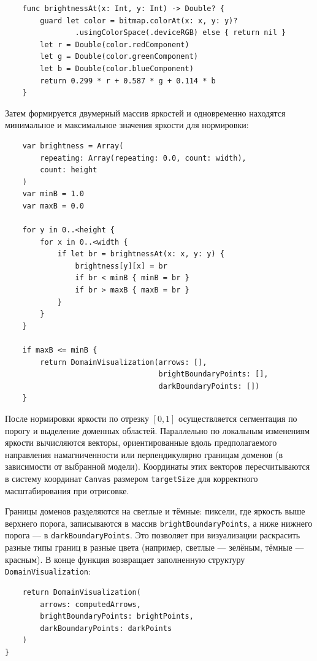 \documentclass[12pt,a4paper]{article}
\numberwithin{equation}{section}
\begin{document}
\begin{verbatim}
    func brightnessAt(x: Int, y: Int) -> Double? {
        guard let color = bitmap.colorAt(x: x, y: y)?
                .usingColorSpace(.deviceRGB) else { return nil }
        let r = Double(color.redComponent)
        let g = Double(color.greenComponent)
        let b = Double(color.blueComponent)
        return 0.299 * r + 0.587 * g + 0.114 * b
    }
\end{verbatim}

Затем формируется двумерный массив яркостей и одновременно находятся минимальное и максимальное значения яркости для нормировки:

\begin{verbatim}
    var brightness = Array(
        repeating: Array(repeating: 0.0, count: width),
        count: height
    )
    var minB = 1.0
    var maxB = 0.0

    for y in 0..<height {
        for x in 0..<width {
            if let br = brightnessAt(x: x, y: y) {
                brightness[y][x] = br
                if br < minB { minB = br }
                if br > maxB { maxB = br }
            }
        }
    }

    if maxB <= minB {
        return DomainVisualization(arrows: [],
                                   brightBoundaryPoints: [],
                                   darkBoundaryPoints: [])
    }
\end{verbatim}

После нормировки яркости по отрезку \([0,1]\) осуществляется сегментация по порогу и выделение доменных областей. Параллельно по локальным изменениям яркости вычисляются векторы, ориентированные вдоль предполагаемого направления намагниченности или перпендикулярно границам доменов (в зависимости от выбранной модели). Координаты этих векторов пересчитываются в систему координат \texttt{Canvas} размером \texttt{targetSize} для корректного масштабирования при отрисовке.

Границы доменов разделяются на светлые и тёмные: пиксели, где яркость выше верхнего порога, записываются в массив \texttt{brightBoundaryPoints}, а ниже нижнего порога — в \texttt{darkBoundaryPoints}. Это позволяет при визуализации раскрасить разные типы границ в разные цвета (например, светлые — зелёным, тёмные — красным). В конце функция возвращает заполненную структуру \texttt{DomainVisualization}:

\begin{verbatim}
    return DomainVisualization(
        arrows: computedArrows,
        brightBoundaryPoints: brightPoints,
        darkBoundaryPoints: darkPoints
    )
}
\end{verbatim}
\end{document}
